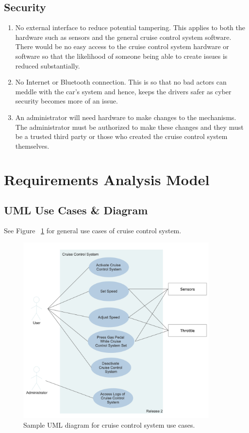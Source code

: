\documentclass[preprint,11pt,3p]{article}
\begin{document}
\subsection{Security}
\begin{enumerate}
	\item No external interface to reduce potential tampering. This applies to both the hardware such as sensors and the general cruise control system software. There would be no easy access to the cruise control system hardware or software so that the likelihood of someone being able to create issues is reduced substantially. 
	\item No Internet or Bluetooth connection. This is so that no bad actors can meddle with the car's system and hence, keeps the drivers safer as cyber security becomes more of an issue.
	\item An administrator will need hardware to make changes to the mechanisms. The administrator must be authorized to make these changes and they must be a trusted third party or those who created the cruise control system themselves. 
\end{enumerate}

\section{Requirements Analysis Model}

\subsection{UML Use Cases \& Diagram} 
See Figure ~\ref{fig:ccUML1} for general use cases of cruise control system.
	\begin{figure}[H]
		\includegraphics[width=0.9\textwidth]{images/ccUseCaseUML.png}
		\caption{Sample UML diagram for cruise control system use cases.}
		\label{fig:ccUML1}
	\end{figure}
\end{document}
